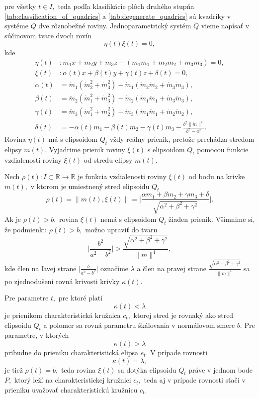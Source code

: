 pre všetky $t \in I,$
teda podľa klasifikácie plôch druhého stupňa \ref{tab:classification_of_quadrics} a \ref{tab:degenerate_quadrics} sú kvadriky v systéme $\dot{Q}$ dve rôznobežné roviny.
Jednoparametrický systém $\dot{Q}$ vieme napísať v súčinovom tvare dvoch rovín 
$$ \eta (t) \xi (t) = 0,$$
kde 
\begin{align*}
\eta(t) & \colon \dot{m}_1 x + \dot{m}_2 y + \dot{m}_3 z - (m_1 \dot{m}_1 + m_2 \dot{m}_2 + m_3 \dot{m}_3) = 0, \\
\xi(t) & \colon  \alpha (t) x + \beta (t) y + \gamma (t) z + \delta (t) = 0, \\
\alpha (t) &= \ddot{m}_1 (\dot{m}_2^2 + \dot{m}_3^2) - \dot{m}_1(\dot{m}_2 \ddot{m}_2 + \dot{m}_3 \ddot{m}_3) , \\
\beta (t) &= \ddot{m}_2 (\dot{m}_1^2 + \dot{m}_3^2) - \dot{m}_2(\dot{m}_1 \ddot{m}_1 + \dot{m}_3 \ddot{m}_3), \\
\gamma (t) &= \ddot{m}_3 (\dot{m}_1^2 + \dot{m}_2^2) - \dot{m}_3(\dot{m}_1 \ddot{m}_1 + \dot{m}_2 \ddot{m}_2), \\
\delta (t) &= - \alpha (t) m_1 - \beta (t) m_2 - \gamma (t) m_3 - \frac{b^2 \| \dot{m} \|^4 }{b^2 - a^2}.
\end{align*}
Rovina $\eta(t)$ má s elipsoidom $Q_t$ vždy reálny prienik, pretože prechádza stredom elipsy $m(t)$. Vyjadrime prienik roviny $\xi(t)$ s elipsoidom $Q_t$ pomocou funkcie vzdialenosti roviny $\xi(t)$ od stredu elipsy $m(t).$

Nech $\rho(t) \colon I \subset \mathbb{R} \rightarrow \mathbb{R}$ je funkcia vzdialenosti roviny $\xi(t)$ od bodu na krivke $m(t),$ v ktorom je umiestnený stred elipsoidu $Q_t$
$$
\rho (t) = \| m(t), \xi(t) \|= \bigg|  \frac{\alpha m_1 + \beta m_2 + \gamma m_3 + \delta}{\sqrt{\alpha^2 + \beta^2 + \gamma^2}} \bigg|.
$$
Ak je $\rho(t) > b,$ rovina $\xi(t)$ nemá s elipsoidom $Q_t$ žiaden prienik. Všimnime si, že podmienku $\rho(t) > b,$ možno upraviť do tvaru
$$
\bigg| \frac{b^2}{a^2 - b^2} \bigg| > \frac{\sqrt{\alpha^2 + \beta^2 + \gamma^2}}{\| \dot{m} \|^4},
$$
kde člen na ľavej strane $\big| \frac{b}{a^2 - b^2} \big|$ označíme $\lambda$ a člen na pravej strane $\frac{\sqrt{\alpha^2 + \beta^2 + \gamma^2}}{\| \dot{m} \|^4} $ sa po zjednodušení rovná krivosti krivky $\kappa(t).$

Pre parametre $t,$ pre ktoré platí 
$$
\kappa(t) < \lambda
$$
je prienikom charakteristická kružnica $c_t,$ ktorej stred je rovnaký ako stred elipsoidu $Q_t$ a polomer sa rovná parametru škálovania v normálovom smere $b$.
Pre parametre, v ktorých
$$
\kappa(t) > \lambda
$$
pribudne do prieniku charakteristická elipsa $e_t.$
V prípade rovnosti
$$
\kappa(t) = \lambda,
$$
je tiež $\rho(t)= b, $ teda rovina $\xi(t)$ sa dotýka elipsoidu $Q_t$ práve v jednom bode $P,$ ktorý leží na charakteristickej kružnici $c_t,$ teda aj v prípade rovnosti stačí v prieniku uvažovať charakteristickú kružnicu $c_t.$

